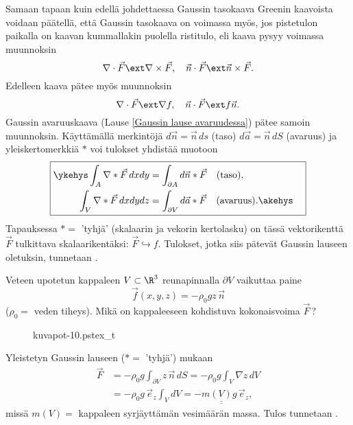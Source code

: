 Samaan tapaan kuin edellä johdettaessa Gaussin tasokaava Greenin kaavoista voidaan
päätellä, että Gaussin tasokaava on voimassa myös, jos pistetulon paikalla on kaavan
kummallakin puolella ristitulo, eli kaava pysyy voimassa muunnoksin
\[
\nabla\cdot\vec F \ext \nabla\times\vec F, \quad \vec n\cdot\vec F \ext \vec n\times\vec F.
\]
Edelleen kaava pätee myös muunnoksin
\[
\nabla\cdot\vec F \ext \nabla f, \quad \vec n\cdot\vec F \ext f\vec n.
\]
Gaussin avaruuskaava (Lause \ref{Gaussin lause avaruudessa}) pätee samoin muunnoksin. 
Käyttämällä merkintöjä $d\vec n=\vec n\,ds$ (taso) $d\vec a=\vec n\,dS$ (avaruus) ja 
yleiskertomerkkiä $\ast$ voi tulokset yhdistää muotoon
\[
\boxed{ \begin{aligned}
\ykehys \int_A \nabla\ast\vec F\,dxdy 
                &= \int_{\partial A} d\vec n\ast\vec F \quad \text{(taso)}, \\
\quad \int_V \nabla\ast\vec F\,dxdydz 
                &= \int_{\partial V} d\vec a\ast\vec F \quad \text{(avaruus)}. \akehys\quad
\end{aligned} }
\]
Tapauksessa $\ast=$ 'tyhjä' (skalaarin ja vekorin kertolasku) on tässä vektorikenttä $\vec F$
tulkittava skalaarikentäksi: $\vec F\hookrightarrow f$. Tulokset, jotka siis pätevät Gaussin 
lauseen oletuksin, tunnetaan .
\begin{multicols}{2} \raggedcolumns
\begin{Exa}
Veteen upotetun kappaleen $V\subset\R^3$ reunapinnalla $\partial V$ vaikuttaa paine
\[
\vec f(x,y,z)=-\rho_0gz\,\vec n
\]
($\rho_0=$ veden tiheys). Mikä on kappaleeseen kohdistuva kokonaisvoima $\vec F\,$?
\begin{figure}[H]
\begin{center}
{kuvapot-10.pstex_t}
\end{center}
\end{figure}
\end{Exa}
\end{multicols}
\ratk Yleistetyn Gaussin lauseen ($\ast=$ 'tyhjä') mukaan
\begin{align*}
\vec F &= -\rho_0 g \int_{\partial V} z\,\vec n\,dS = -\rho_0 g \int_V \nabla z\,dV \\
       &= -\rho_0 g\,\vec e_z \int_V dV = \underline{\underline{-m(V)g\,\vec e_z}},
\end{align*}
missä $m(V)=$ kappaleen syrjäyttämän vesimäärän massa. Tulos tunnetaan \newline
{} . \loppu

